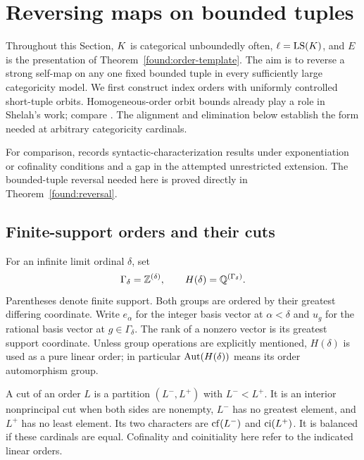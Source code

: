 \section{Reversing maps on bounded tuples}
\label{found:section-reversal}

Throughout this Section, $K$ is categorical unboundedly often,
$\ell=\operatorname{LS}(K)$, and $E$ is the presentation of
Theorem~\ref{found:order-template}. The aim is to reverse a strong
self-map on any one fixed bounded tuple in every sufficiently large
categoricity model. We first construct index orders with uniformly
controlled short-tuple orbits.  Homogeneous-order orbit bounds already
play a role in Shelah's work; compare \cite[IV.5.1]{Shelah2009}.
The alignment and elimination below establish the form needed at arbitrary
categoricity cardinals.

For comparison, \cite[Fact~1.4 and the discussion of Claim~1.5,
pp.~3--4]{BoneyVasey2015} records syntactic-characterization results
under exponentiation or cofinality conditions and a gap in the attempted
unrestricted extension. The bounded-tuple reversal needed here is proved
directly in Theorem~\ref{found:reversal}.

\subsection{Finite-support orders and their cuts}

\begin{definition}
\label{found:orders-definition}
For an infinite limit ordinal $\delta$, set
\[
\Gamma_\delta=\mathbb Z^{(\delta)},\qquad
H(\delta)=\mathbb Q^{(\Gamma_\delta)}.
\]
Parentheses denote finite support. Both groups are ordered by their
greatest differing coordinate. Write $e_\alpha$ for the integer basis
vector at $\alpha<\delta$ and $u_g$ for the rational basis vector at
$g\in\Gamma_\delta$. The rank of a nonzero vector is its greatest
support coordinate. Unless group operations are explicitly mentioned,
$H(\delta)$ is used as a pure linear order; in particular
$\operatorname{Aut}(H(\delta))$ means its order automorphism group.

A cut of an order $L$ is a partition $(L^-,L^+)$ with $L^-<L^+$.
It is an interior nonprincipal cut when both sides are nonempty,
$L^-$ has no greatest element, and $L^+$ has no least element. Its
two characters are $\operatorname{cf}(L^-)$ and $\operatorname{ci}(L^+)$. It is balanced if
these cardinals are equal. Cofinality and coinitiality here refer
to the indicated linear orders.
\end{definition}

